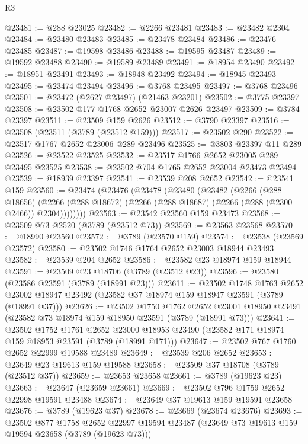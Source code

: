 \begin{lexlean}{R3}
\begin{coremodule}
@23481 := @288 @23025
@23482 := @2266 @23481
@23483 := @23482 @2304
@23484 := @23480 @23483
@23485 := @23478 @23484
@23486 := @23476 @23485
@23487 := @19598 @23486
@23488 := @19595 @23487
@23489 := @19592 @23488
@23490 := @19589 @23489
@23491 := @18954 @23490
@23492 := @18951 @23491
@23493 := @18948 @23492
@23494 := @18945 @23493
@23495 := @23474 @23494
@23496 := @3768 @23495
@23497 := @3768 @23496
@23501 := @23472 (@2627 @23497) (@21463 @23201)
@23502 := @3775 @23397
@23508 := @23502 @177 @1768 @2652 @23007 @2626 @23497
@23509 := @3784 @23397
@23511 := @23509 @159 @2626
@23512 := @3790 @23397
@23516 := @23508 (@23511 (@3789 (@23512 @159)))
@23517 := @23502 @290
@23522 := @23517 @1767 @2652 @23006 @289 @23496
@23525 := @3803 @23397 @11 @289
@23526 := @23522 @23525
@23532 := @23517 @1766 @2652 @23005 @289 @23495 @23525
@23538 := @23502 @704 @1765 @2652 @23004 @23473 @23494
@23539 := @18939 @23397
@23541 := @23539 @208 @2652
@23542 := @23541 @159
@23560 := @23474
    (@23476
      (@23478
        (@23480
          (@23482
            (@2266
              (@288 @18656)
              (@2266 (@288 @18672) (@2266 (@288 @18687) (@2266 (@288 (@2300 @2466)) @2304))))))))
@23563 := @23542 @23560 @159 @23473
@23568 := @23509 @73 @2520 (@3789 (@23512 @73))
@23569 := @23563 @23568
@23570 := @18990 @23560
@23572 := @3789 (@23570 @159)
@23574 := @23538 (@23569 @23572)
@23580 := @23502 @1746 @1764 @2652 @23003 @18944 @23493
@23582 := @23539 @204 @2652
@23586 := @23582 @23 @18974 @159 @18944
@23591 := @23509 @23 @18706 (@3789 (@23512 @23))
@23596 := @23580 (@23586 @23591 (@3789 (@18991 @23)))
@23611 := @23502
    @1748
    @1763
    @2652
    @23002
    @18947
    @23492
    (@23582 @37 @18974 @159 @18947 @23591 (@3789 (@18991 @37)))
@23626 := @23502
    @1750
    @1762
    @2652
    @23001
    @18950
    @23491
    (@23582 @73 @18974 @159 @18950 @23591 (@3789 (@18991 @73)))
@23641 := @23502
    @1752
    @1761
    @2652
    @23000
    @18953
    @23490
    (@23582 @171 @18974 @159 @18953 @23591 (@3789 (@18991 @171)))
@23647 := @23502 @767 @1760 @2652 @22999 @19588 @23489
@23649 := @23539 @206 @2652
@23653 := @23649 @23 @19613 @159 @19588
@23658 := @23509 @37 @18708 (@3789 (@23512 @37))
@23659 := @23653 @23658
@23661 := @3789 (@19623 @23)
@23663 := @23647 (@23659 @23661)
@23669 := @23502 @796 @1759 @2652 @22998 @19591 @23488
@23674 := @23649 @37 @19613 @159 @19591 @23658
@23676 := @3789 (@19623 @37)
@23678 := @23669 (@23674 @23676)
@23693 := @23502
    @877
    @1758
    @2652
    @22997
    @19594
    @23487
    (@23649 @73 @19613 @159 @19594 @23658 (@3789 (@19623 @73)))

\end{coremodule}
\end{lexlean}
